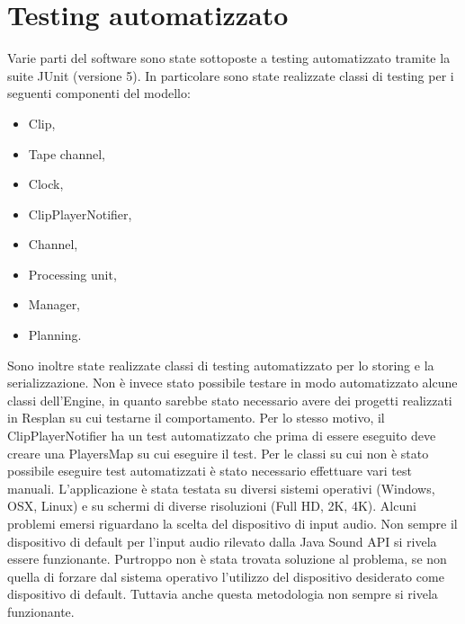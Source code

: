 \documentclass[a4paper,12pt]{report}
\begin{document}
\section{Testing automatizzato}
Varie parti del software sono state sottoposte a testing automatizzato tramite la suite JUnit (versione 5).
In particolare sono state realizzate classi di testing per i seguenti componenti del modello:
\begin{itemize}
    \item Clip,
    \item Tape channel,
    \item Clock,
    \item ClipPlayerNotifier,
    \item Channel,
    \item Processing unit,
    \item Manager,
    \item Planning.
\end{itemize}
Sono inoltre state realizzate classi di testing automatizzato per lo storing e la serializzazione.
Non è invece stato possibile testare in modo automatizzato alcune classi dell’Engine, in quanto sarebbe stato necessario avere dei progetti realizzati in Resplan su cui testarne il comportamento. 
Per lo stesso motivo, il ClipPlayerNotifier ha un test automatizzato che prima di essere eseguito deve creare una PlayersMap su cui eseguire il test.
Per le classi su cui non è stato possibile eseguire test automatizzati è stato necessario effettuare vari test manuali.
L’applicazione è stata testata su diversi sistemi operativi (Windows, OSX, Linux) e su schermi di diverse risoluzioni (Full HD, 2K, 4K).
Alcuni problemi emersi riguardano la scelta del dispositivo di input audio. Non sempre il dispositivo di default per l’input audio rilevato dalla Java Sound API si rivela essere funzionante. Purtroppo non è stata trovata soluzione al problema, se non quella di forzare dal sistema operativo l’utilizzo del dispositivo desiderato come dispositivo di default. Tuttavia anche questa metodologia non sempre si rivela funzionante.
\end{document}
